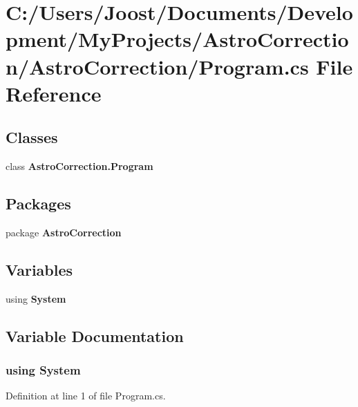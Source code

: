 \section{C:/Users/Joost/Documents/Development/MyProjects/AstroCorrection/AstroCorrection/Program.cs File Reference}
\label{_program_8cs}
\subsection*{Classes}
\begin{DoxyCompactItemize}
\item 
class {\bfseries AstroCorrection.Program}
\end{DoxyCompactItemize}
\subsection*{Packages}
\begin{DoxyCompactItemize}
\item 
package {\bf AstroCorrection}
\end{DoxyCompactItemize}
\subsection*{Variables}
\begin{DoxyCompactItemize}
\item 
﻿using {\bf System}
\end{DoxyCompactItemize}


\subsection{Variable Documentation}
\subsubsection[{System}]{\setlength{\rightskip}{0pt plus 5cm}﻿using {\bf System}}\label{_program_8cs_a81a223a02c34d82b47199f08308847f2}


Definition at line 1 of file Program.cs.